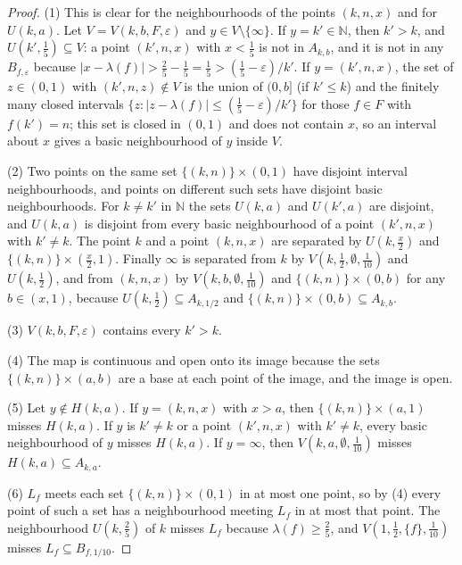 \documentclass[11pt]{amsart}
\theoremstyle{definition}
\theoremstyle{remark}
\newcommand{\N}{\mathbb{N}}
\numberwithin{equation}{section}
\begin{document}
\begin{proof}
(1) This is clear for the neighbourhoods of the points $(k,n,x)$ and for $U(k,a)$. Let $V=V(k,b,F,\varepsilon)$ and $y\in V\setminus\{\infty\}$. If $y=k'\in\N$, then $k'>k$, and $U(k',\frac15)\subseteq V$: a point $(k',n,x)$ with $x<\frac15$ is not in $A_{k,b}$, and it is not in any $B_{f,\varepsilon}$ because $|x-\lambda(f)|>\frac25-\frac15=\frac15>(\frac15-\varepsilon)/k'$. If $y=(k',n,x)$, the set of $z\in(0,1)$ with $(k',n,z)\notin V$ is the union of $(0,b]$ (if $k'\le k$) and the finitely many closed intervals $\{z:|z-\lambda(f)|\le(\frac15-\varepsilon)/k'\}$ for those $f\in F$ with $f(k')=n$; this set is closed in $(0,1)$ and does not contain $x$, so an interval about $x$ gives a basic neighbourhood of $y$ inside $V$.

(2) Two points on the same set $\{(k,n)\}\times(0,1)$ have disjoint interval neighbourhoods, and points on different such sets have disjoint basic neighbourhoods. For $k\ne k'$ in $\N$ the sets $U(k,a)$ and $U(k',a)$ are disjoint, and $U(k,a)$ is disjoint from every basic neighbourhood of a point $(k',n,x)$ with $k'\ne k$. The point $k$ and a point $(k,n,x)$ are separated by $U(k,\frac x2)$ and $\{(k,n)\}\times(\frac x2,1)$. Finally $\infty$ is separated from $k$ by $V(k,\frac12,\emptyset,\frac1{10})$ and $U(k,\frac12)$, and from $(k,n,x)$ by $V(k,b,\emptyset,\frac1{10})$ and $\{(k,n)\}\times(0,b)$ for any $b\in(x,1)$, because $U(k,\frac12)\subseteq A_{k,1/2}$ and $\{(k,n)\}\times(0,b)\subseteq A_{k,b}$.

(3) $V(k,b,F,\varepsilon)$ contains every $k'>k$.

(4) The map is continuous and open onto its image because the sets $\{(k,n)\}\times(a,b)$ are a base at each point of the image, and the image is open.

(5) Let $y\notin H(k,a)$. If $y=(k,n,x)$ with $x>a$, then $\{(k,n)\}\times(a,1)$ misses $H(k,a)$. If $y$ is $k'\ne k$ or a point $(k',n,x)$ with $k'\ne k$, every basic neighbourhood of $y$ misses $H(k,a)$. If $y=\infty$, then $V(k,a,\emptyset,\frac1{10})$ misses $H(k,a)\subseteq A_{k,a}$.

(6) $L_f$ meets each set $\{(k,n)\}\times(0,1)$ in at most one point, so by (4) every point of such a set has a neighbourhood meeting $L_f$ in at most that point. The neighbourhood $U(k,\frac25)$ of $k$ misses $L_f$ because $\lambda(f)\ge\frac25$, and $V(1,\frac12,\{f\},\frac1{10})$ misses $L_f\subseteq B_{f,1/10}$.
\end{proof}
\end{document}
